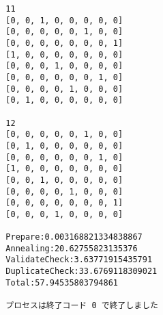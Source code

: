 \documentclass[uplatex,dvipdfmx,a4paper,11pt,oneside,openany]{jsbook}
\begin{document}
\begin{verbatim}
  11
  [0, 0, 1, 0, 0, 0, 0, 0]
  [0, 0, 0, 0, 0, 1, 0, 0]
  [0, 0, 0, 0, 0, 0, 0, 1]
  [1, 0, 0, 0, 0, 0, 0, 0]
  [0, 0, 0, 1, 0, 0, 0, 0]
  [0, 0, 0, 0, 0, 0, 1, 0]
  [0, 0, 0, 0, 1, 0, 0, 0]
  [0, 1, 0, 0, 0, 0, 0, 0]

  12
  [0, 0, 0, 0, 0, 1, 0, 0]
  [0, 1, 0, 0, 0, 0, 0, 0]
  [0, 0, 0, 0, 0, 0, 1, 0]
  [1, 0, 0, 0, 0, 0, 0, 0]
  [0, 0, 1, 0, 0, 0, 0, 0]
  [0, 0, 0, 0, 1, 0, 0, 0]
  [0, 0, 0, 0, 0, 0, 0, 1]
  [0, 0, 0, 1, 0, 0, 0, 0]

  Prepare:0.003168821334838867
  Annealing:20.62755823135376
  ValidateCheck:3.63771915435791
  DuplicateCheck:33.6769118309021
  Total:57.94535803794861

  プロセスは終了コード 0 で終了しました
\end{verbatim}
\end{document}
